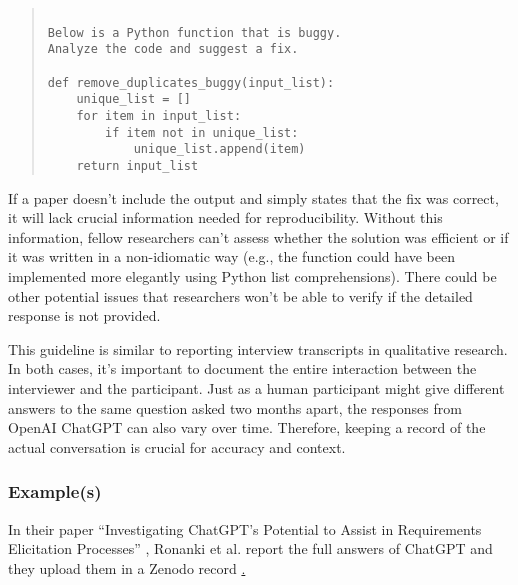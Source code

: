 \begin{quote}
\begin{verbatim}

Below is a Python function that is buggy. 
Analyze the code and suggest a fix.

def remove_duplicates_buggy(input_list):
    unique_list = []
    for item in input_list:
        if item not in unique_list:
            unique_list.append(item)
    return input_list 

\end{verbatim}
\end{quote}

If a paper doesn't include the output and simply states that the fix was correct, it will lack crucial information needed for reproducibility. Without this information, fellow researchers can't assess whether the solution was efficient or if it was written in a non-idiomatic way (e.g., the function could have been implemented more elegantly using Python list comprehensions). There could be other potential issues that researchers won't be able to verify if the detailed response is not provided.

This guideline is similar to reporting interview transcripts in qualitative research. In both cases, it's important to document the entire interaction between the interviewer and the participant. Just as a human participant might give different answers to the same question asked two months apart, the responses from OpenAI ChatGPT can also vary over time. Therefore, keeping a record of the actual conversation is crucial for accuracy and context.



\subsubsection{Example(s)}

In their paper ``Investigating ChatGPT's Potential to Assist in Requirements Elicitation Processes'' \cite{ronanki2023investigating}, Ronanki et al. report the full answers of ChatGPT and they upload them in a Zenodo record \href{https://zenodo.org/records/8124936}. 

